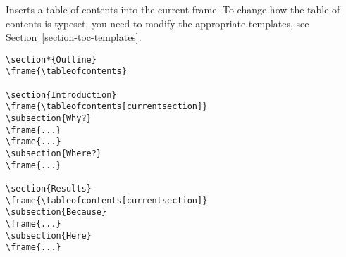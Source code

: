 \begin{command}{\tableofcontents{}}
  Inserts a table of contents into the current frame. To change how
  the table of contents is typeset, you need to modify the appropriate
  templates, see Section~\ref{section-toc-templates}. 
  \example
\begin{verbatim}
\section*{Outline}
\frame{\tableofcontents}

\section{Introduction}
\frame{\tableofcontents[currentsection]}
\subsection{Why?}
\frame{...}
\frame{...}
\subsection{Where?}
\frame{...}

\section{Results}
\frame{\tableofcontents[currentsection]}
\subsection{Because}
\frame{...}
\subsection{Here}
\frame{...}
\end{verbatim}


\end{command}
